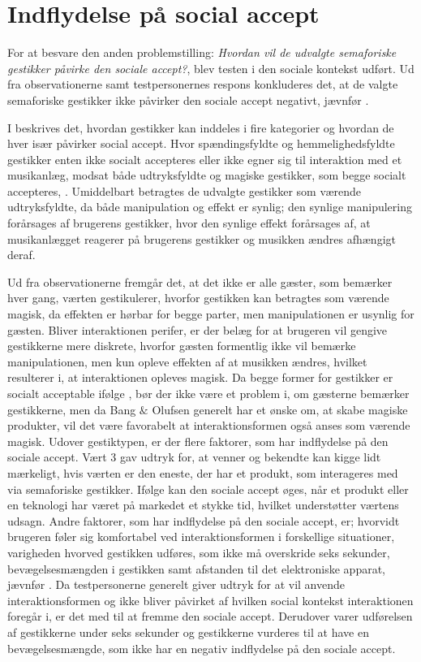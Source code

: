 \section{Indflydelse på social accept}
\label{DiskussionSocialAccept}
%
For at besvare den anden problemstilling: \textit{Hvordan vil de udvalgte semaforiske gestikker påvirke den sociale accept?}, blev testen i den sociale kontekst udført. Ud fra observationerne samt testpersonernes respons konkluderes det, at de valgte semaforiske gestikker ikke påvirker den sociale accept negativt, jævnfør .
 
I  beskrives det, hvordan gestikker kan inddeles i fire kategorier og hvordan de hver især påvirker social accept. Hvor spændingsfyldte og hemmelighedsfyldte gestikker enten ikke socialt accepteres eller ikke egner sig til interaktion med et musikanlæg, modsat både udtryksfyldte og magiske gestikker, som begge socialt accepteres, \parencite[s. 276]{PDF:WouldYouDoThat}. Umiddelbart betragtes de udvalgte gestikker som værende udtryksfyldte, da både manipulation og effekt er synlig; den synlige manipulering forårsages af brugerens gestikker, hvor den synlige effekt forårsages af, at musikanlægget reagerer på brugerens gestikker og musikken ændres afhængigt deraf.

Ud fra observationerne fremgår det, at det ikke er alle gæster, som bemærker hver gang, værten gestikulerer, hvorfor gestikken kan betragtes som værende magisk, da effekten er hørbar for begge parter, men manipulationen er usynlig for gæsten. Bliver interaktionen perifer, er der belæg for at brugeren vil gengive gestikkerne mere diskrete, hvorfor gæsten formentlig ikke vil bemærke manipulationen, men kun opleve effekten af at musikken ændres, hvilket resulterer i, at interaktionen opleves magisk. Da begge former for gestikker er socialt acceptable ifølge \textcite[s. 277]{PDF:WouldYouDoThat}, bør der ikke være et problem i, om gæsterne bemærker gestikkerne, men da Bang $\&$ Olufsen generelt har et ønske om, at skabe magiske produkter, vil det være favorabelt at interaktionsformen også anses som værende magisk.\blankline
%
Udover gestiktypen, er der flere faktorer, som har indflydelse på den sociale accept. Vært 3 gav udtryk for, at venner og bekendte kan kigge lidt mærkeligt, hvis værten er den eneste, der har et produkt, som interageres med via semaforiske gestikker. Ifølge \textcite[s. 276]{PDF:WouldYouDoThat} kan den sociale accept øges, når et produkt eller en teknologi har været på markedet et stykke tid, hvilket understøtter værtens udsagn. Andre faktorer, som har indflydelse på den sociale accept, er; hvorvidt brugeren føler sig komfortabel ved interaktionsformen i forskellige situationer, varigheden hvorved gestikken udføres, som ikke må overskride seks sekunder, bevægelsesmængden i gestikken samt afstanden til det elektroniske apparat, jævnfør . Da testpersonerne generelt giver udtryk for at vil anvende interaktionsformen og ikke bliver påvirket af hvilken social kontekst interaktionen foregår i, er det med til at fremme den sociale accept. Derudover varer udførelsen af gestikkerne under seks sekunder og gestikkerne vurderes til at have en bevægelsesmængde, som ikke har en negativ indflydelse på den sociale accept. 

